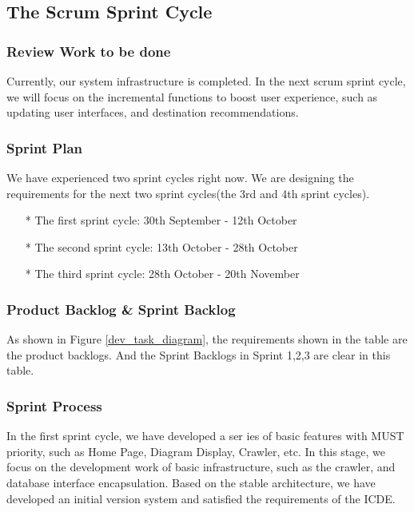 \documentclass[conference]{IEEEtran}
\begin{document}
\subsection{\textbf{The Scrum Sprint Cycle}}

\subsubsection{\textbf{Review Work to be done}}

Currently, our system infrastructure is completed. In the next scrum sprint cycle, we will focus on the incremental functions to boost user experience, such as updating user interfaces, and destination recommendations.


\subsubsection{\textbf{Sprint Plan}}

We have experienced two sprint cycles right now. We are designing the requirements for the next two sprint cycles(the 3rd and 4th sprint cycles).

\begin{itemize}
\item[*] The first sprint cycle: 30th September - 12th October
\item[*] The second sprint cycle: 13th October - 28th October
\item[*] The third sprint cycle: 28th October - 20th November
\end{itemize}

\subsubsection{\textbf{Product Backlog \& Sprint Backlog}}

As shown in Figure \ref{dev_task_diagram}, the requirements shown in the table are the product backlogs. And the Sprint Backlogs in Sprint 1,2,3 are clear in this table.

\subsubsection{\textbf{Sprint Process}}

In the first sprint cycle, we have developed a ser
ies of basic features with MUST priority, such as Home Page, Diagram Display, Crawler, etc. In this stage, we focus on the development work of basic infrastructure, such as the crawler, and database interface encapsulation. Based on the stable architecture, we have developed an initial version system and satisfied the requirements of the ICDE.
\end{document}
